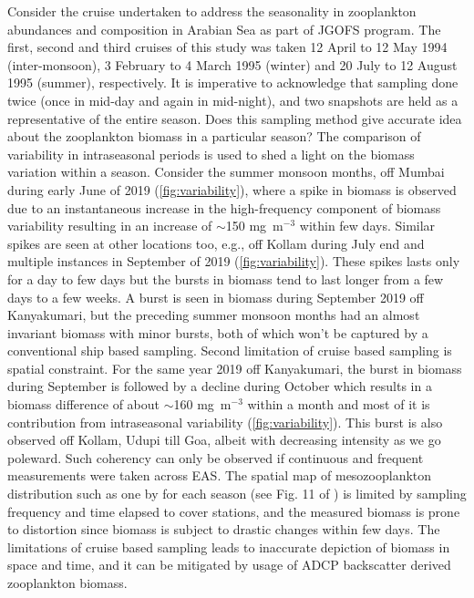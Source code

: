 \documentclass{article}
\begin{document}
    Consider the cruise undertaken to address the seasonality in zooplankton abundances and composition \citep{madhupratap1996lack} in Arabian Sea as part of JGOFS program. The first, second and third cruises of this study was taken  12 April to 12 May 1994 (inter-monsoon), 3 February to 4 March 1995 (winter) and 20 July to 12 August 1995 (summer), respectively. It is imperative to acknowledge that sampling done twice (once in mid-day and again in mid-night), and two snapshots are held as a representative of the entire season. Does this sampling method give accurate idea about the zooplankton biomass in a particular season? The comparison of variability in intraseasonal periods is used to shed a light on the biomass variation within a season. Consider the summer monsoon months, off Mumbai during early June of 2019 (\cref{fig:variability}), where a spike in biomass is observed due to an instantaneous increase in the high-frequency component of biomass variability resulting in an increase of $\sim$150 mg~m$^{-3}$ within few days. Similar spikes are seen at other locations too, e.g., off Kollam during July end and multiple instances in September of 2019 (\cref{fig:variability}). These spikes lasts only for a day to few days but the bursts in biomass tend to last longer from a few days to a few weeks. A burst is seen in biomass during September 2019 off Kanyakumari, but the preceding summer monsoon months had an almost invariant biomass with minor bursts, both of which won’t be captured by a conventional ship based sampling. Second limitation of cruise based sampling is spatial constraint. For the same year 2019 off Kanyakumari, the burst in biomass during September is followed by a decline during October which results in a biomass difference of about $\sim$160 mg~m$^{-3}$ within a month and most of it is contribution from intraseasonal variability (\cref{fig:variability}). This burst is also observed off Kollam, Udupi till Goa, albeit with decreasing intensity as we go poleward. Such coherency can only be observed if continuous and frequent measurements were taken across EAS. The spatial map of mesozooplankton distribution such as one by \citet{jyothibabu2010re} for each season (see Fig. 11 of \cite{jyothibabu2010re}) is limited by sampling frequency and time elapsed to cover stations, and the measured biomass is prone to distortion since biomass is subject to drastic changes within few days. The limitations of cruise based sampling leads to inaccurate depiction of biomass in space and time, and it can be mitigated by usage of ADCP backscatter derived zooplankton biomass.
     
\end{document}
